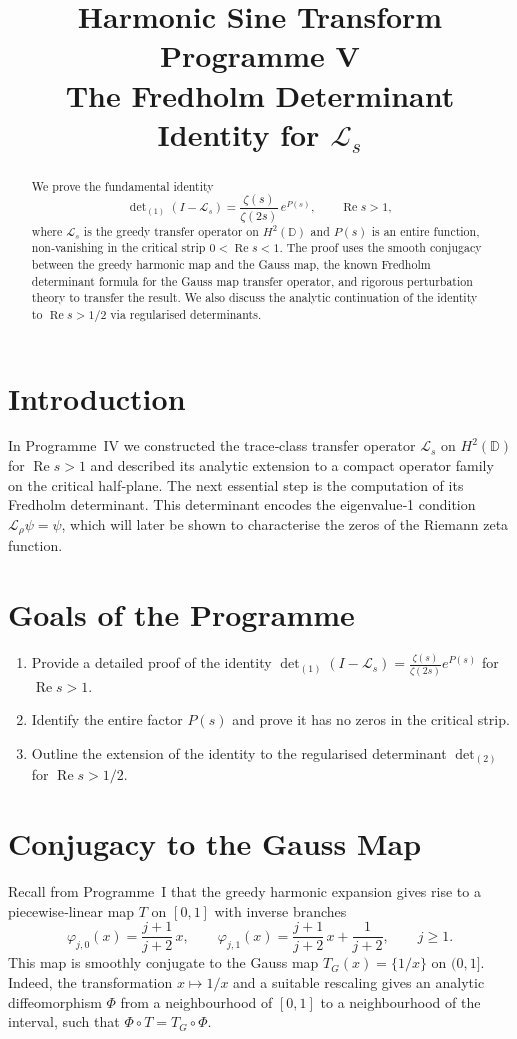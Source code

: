 \documentclass[11pt,a4paper]{article}
\title{\bfseries Harmonic Sine Transform Programme V\\
\large The Fredholm Determinant Identity for \(\mathcal{L}_s\)}
\author{}
\date{}
\begin{document}
\maketitle

\begin{abstract}
We prove the fundamental identity
\[
\det\nolimits_{(1)}(I-\mathcal{L}_s) = \frac{\zeta(s)}{\zeta(2s)}\,e^{P(s)},\qquad \operatorname{Re}s>1,
\]
where \(\mathcal{L}_s\) is the greedy transfer operator on \(H^2(\mathbb{D})\) and \(P(s)\) is an entire function, non‑vanishing in the critical strip \(0<\operatorname{Re}s<1\).  The proof uses the smooth conjugacy between the greedy harmonic map and the Gauss map, the known Fredholm determinant formula for the Gauss map transfer operator, and rigorous perturbation theory to transfer the result.  We also discuss the analytic continuation of the identity to \(\operatorname{Re}s>1/2\) via regularised determinants.
\end{abstract}

\section{Introduction}
In Programme~IV we constructed the trace‑class transfer operator \(\mathcal{L}_s\) on \(H^2(\mathbb{D})\) for \(\operatorname{Re}s>1\) and described its analytic extension to a compact operator family on the critical half‑plane.  The next essential step is the computation of its Fredholm determinant.  This determinant encodes the eigenvalue‑1 condition \(\mathcal{L}_\rho\psi=\psi\), which will later be shown to characterise the zeros of the Riemann zeta function.

\section{Goals of the Programme}
\begin{enumerate}
\item Provide a detailed proof of the identity \(\det\nolimits_{(1)}(I-\mathcal{L}_s) = \frac{\zeta(s)}{\zeta(2s)}e^{P(s)}\) for \(\operatorname{Re}s>1\).
\item Identify the entire factor \(P(s)\) and prove it has no zeros in the critical strip.
\item Outline the extension of the identity to the regularised determinant \(\det\nolimits_{(2)}\) for \(\operatorname{Re}s>1/2\).
\end{enumerate}

\section{Conjugacy to the Gauss Map}
Recall from Programme~I that the greedy harmonic expansion gives rise to a piecewise‑linear map \(T\) on \([0,1]\) with inverse branches
\[
\varphi_{j,0}(x) = \frac{j+1}{j+2}\,x,\qquad
\varphi_{j,1}(x) = \frac{j+1}{j+2}\,x + \frac{1}{j+2},\qquad j\ge 1.
\]
This map is smoothly conjugate to the Gauss map \(T_G(x) = \{1/x\}\) on \((0,1]\).  Indeed, the transformation \(x \mapsto 1/x\) and a suitable rescaling gives an analytic diffeomorphism \(\Phi\) from a neighbourhood of \([0,1]\) to a neighbourhood of the interval, such that \(\Phi\circ T = T_G\circ\Phi\).
\end{document}
